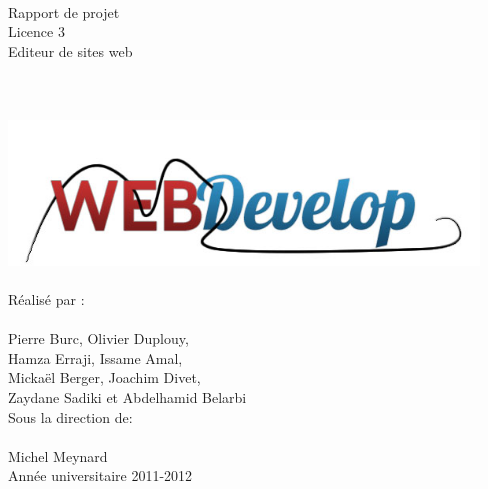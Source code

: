 \documentclass[a4paper, 12pt]{report}
\begin{document}
	\begin{titlepage}
			\\ 
		~\\
		~\\
		~\\
		~\\
		~\\		
		\begin{center}
			{\large Rapport de projet} \\
			{\large Licence 3}\\
			\vspace{1,5cm}
			{\Huge Editeur de sites web}\\
			~\\
			~\\
			~\\
			\includegraphics[width=12.5cm]{images/logoTest1.png}
			~\\
			~\\
			{\large Réalisé par :} \\
			~\\
			{\LARGE Pierre Burc, Olivier Duplouy, \\
				      Hamza Erraji, Issame Amal,\\
				      Mickaël Berger, Joachim Divet,\\
				      Zaydane Sadiki et Abdelhamid Belarbi}\\
			\vspace{1,5cm}
			{\large Sous la direction de:} \\
			~\\
			{\LARGE Michel Meynard} \\
			\vspace{2.5cm}
			{\large Année universitaire 2011-2012 }			
		\end{center}
	\end{titlepage}
\end{document}
